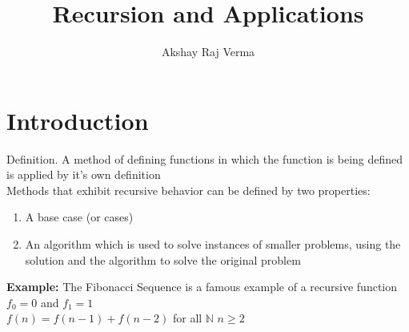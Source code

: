 \documentclass{article}
\begin{document}
\lstset{language=C}
\title{Recursion and Applications}
\author{Akshay Raj Verma}
\maketitle
\section{Introduction}
{Definition.} A method of defining functions in which the function is being defined is applied by it's own definition
\\
Methods that exhibit recursive behavior can be defined by two properties: \\
\begin{enumerate}
	\item A base case (or cases)
	\item An algorithm which is used to solve instances of smaller problems, using the solution and the algorithm to solve the original problem
\end{enumerate}
{\bf Example:} The Fibonacci Sequence is a famous example of a recursive function\\
\hspace{10mm}{\bf Base Case:}  \hspace{10mm}$f_0=0$ and $f_1=1$
\\
\hspace{10mm}{\bf Formula:} \hspace{11mm} $f(n)=f(n-1)+f(n-2)$ for all $\mathbb{N}$ $ n \geq 2$
\\
\end{document}

